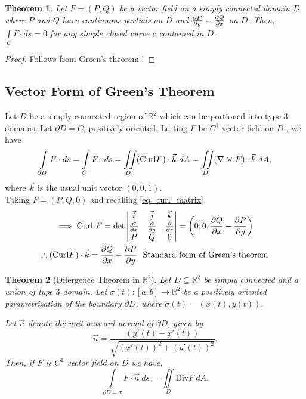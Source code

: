 \documentclass[
	12pt,
	]{article}
\newcommand{\R}{\mathbb{R}}
\theoremstyle{custom}
\newtheorem{theorem}{Theorem}[section]
\theoremstyle{custom}
\theoremstyle{custom}
\theoremstyle{custom}
\theoremstyle{custom}
\theoremstyle{definition}
\theoremstyle{example}
\theoremstyle{note}
\theoremstyle{remark}
\theoremstyle{example}
\newcounter{theo}[section]\setcounter{theo}{0}
\numberwithin{equation}{subsection}
\begin{document}
  				\begin{theorem}
  					Let $F =(P,Q)$ be a vector field on a simply connected domain $D$ where $P$ and $Q$ have continuous partials on $D$ and $\pdv{P}{y} = \pdv{Q}{x}$ on $D$. Then, $\int\limits_{C} F \cdot ds =0$ for any simple closed curve $c$ contained in $D$.
  				\end{theorem}
  				\begin{proof}
  					Follows from Green's theorem !
  				\end{proof}
  				
  			\subsection{Vector Form of Green's Theorem}
  				Let $D$ be a simply connected region of $\R^{2}$ which can be portioned into type $3$ domains. Let $\partial D  = C$, positively oriented. Letting $F$ be  $C^{1}$ vector field on $D$ , we have
  				\begin{equation}
  					\int\limits_{\partial D} F \cdot ds = \int\limits_{C} F \cdot ds = \iint\limits_{D}(\text{Curl}F)\cdot \vec{k} \ dA = \iint\limits_{D} (\nabla \cross F)\cdot \vec{k} \ dA,
  				\end{equation}
  				where $\vec{k}$ is the usual unit vector $(0,0,1)$.\\
  				
  				\noindent Taking $F = (P,Q,0)$  and recalling \eqref{eq_curl_matrix}
  				\begin{gather*}
  					\implies \text{Curl }F = \det 
  					\begin{vmatrix}
  						\vec{i} & \vec{j}& \vec{k} \\
  						\pdv{}{x} & \pdv{}{y} & \pdv{}{z} \\
  						P & Q & 0
  					\end{vmatrix} = \left(0,0,\pdv{Q}{x} - \pdv{P}{y}\right)\\
  					\therefore (\text{Curl}F)\cdot \vec{k} = \pdv{Q}{x}- \pdv{P}{y} \ \ \text{Standard form of Green's theorem}
  				\end{gather*}
  				
  				\begin{theorem}[Difergence Theorem in $\R^{2}$]
  					Let $D\subseteq \R^{2}$ be simply connected and a union of type $3$ domain. Let $\sigma(t) : [a,b] \to \R^{2}$ be a positively oriented parametrization of the boundary $\partial D$, where $\sigma(t) = (x(t), y(t))$. 
  					
  					Let $\vec{n}$ denote the unit outward normal of $\partial D$, given by 
  					\begin{equation} 
  					\vec{n} = \frac{(y'(t) - x'(t))}{\sqrt{(x'(t))^{2} + (y'(t))^{2}}}.
  					\end{equation}
  					Then, if $F$ is $C^{1}$ vector field on $D$ we have,
  					\begin{equation} 
  					\int\limits_{\partial D = \sigma}F \cdot \vec{n} \ ds = \iint\limits_{D} \textrm{Div}{F} \ dA.
  					\end{equation}
  				\end{theorem}
  				
\end{document}
